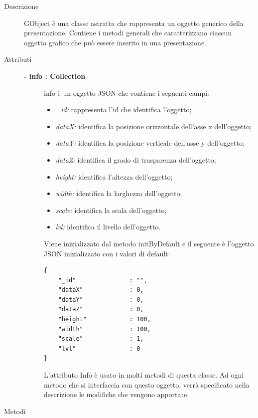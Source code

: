 \begin{description}
\item[Descrizione] \hfill
	GObject è una classe astratta che rappresenta un oggetto generico della presentazione. Contiene i metodi generali che caratterizzano ciascun oggetto grafico che può essere inserito in una presentazione.
	
\item[Attributi] \hfill
	\begin{description}
		\item[\textbf{- info : Collection			}] \hfill
			info è un oggetto JSON che contiene i seguenti campi:
				\begin{itemize}
					\item \textit{\_id:} rappresenta l'id che identifica l'oggetto;
					\item \textit{dataX:} identifica la posizione orizzontale dell'asse x dell'oggetto;
					\item \textit{dataY:} identifica la posizione verticale dell'asse y dell'oggetto;
					\item \textit{dataZ:} identifica il grado di trasparenza dell'oggetto;
					\item \textit{height:} identifica l'altezza dell'oggetto;
					\item \textit{width:} identifica la larghezza dell'oggetto;
					\item \textit{scale:} identifica la scala dell'oggetto; 
					\item \textit{lvl:} identifica il livello dell'oggetto. 
				\end{itemize}
			
			Viene inizializzato dal metodo initByDefault e il seguente è l'oggetto JSON inizializzato con i valori di default:
\begin{lstlisting}
{
    "_id"               : "",
    "dataX"             : 0,
    "dataY"             : 0,
    "dataZ"             : 0,
    "height"            : 100,
    "width"             : 100,
    "scale"             : 1,
    "lvl"               : 0
}
\end{lstlisting}					
                 L'attributo Info è usato in molti metodi di questa classe. Ad ogni metodo che si interfaccia con questo oggetto, verrà specificato nella descrizione le modifiche che vengono apportate. 
		
	\end{description}
	
	
\item[Metodi] \hfill


\end{description}

